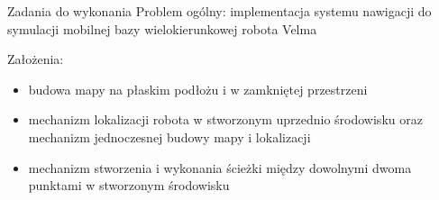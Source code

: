\begin{frame}
{Zadania do wykonania}
Problem ogólny: implementacja systemu nawigacji do symulacji mobilnej bazy wielokierunkowej robota Velma

Założenia:
	\begin{itemize}
		\item budowa mapy na płaskim podłożu i w zamkniętej przestrzeni
		\item mechanizm lokalizacji robota w stworzonym uprzednio środowisku oraz mechanizm jednoczesnej budowy mapy i lokalizacji
		\item mechanizm stworzenia i wykonania ścieżki między dowolnymi dwoma punktami w stworzonym środowisku
	\end{itemize}
\end{frame}


